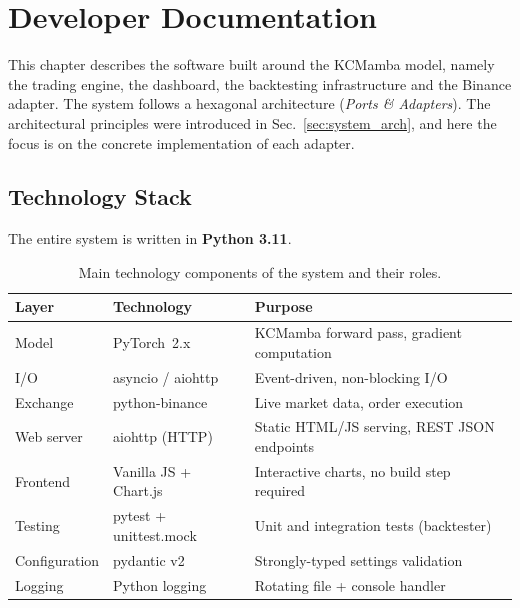 \chapter{Developer Documentation}
\label{ch:implementacio}

This chapter describes the software built around the KCMamba model, namely
the trading engine, the dashboard, the backtesting infrastructure and the Binance adapter.
The system follows a hexagonal architecture (\emph{Ports \& Adapters}).
The architectural principles were introduced in Sec.~\ref{sec:system_arch},
and here the focus is on the concrete implementation of each adapter.

\section{Technology Stack}
\label{sec:impl_tech}

The entire system is written in \textbf{Python 3.11}.

\begin{table}[H]
  \centering
  \small
  \begin{tabular}{|l|l|p{7cm}|}
    \hline
    \textbf{Layer} & \textbf{Technology} & \textbf{Purpose} \\
    \hline\hline
    Model          & PyTorch~2.x          & KCMamba forward pass, gradient computation \\
    I/O            & asyncio / aiohttp    & Event-driven, non-blocking I/O \\
    Exchange       & python-binance       & Live market data, order execution \\
    Web server     & aiohttp (HTTP)       & Static HTML/JS serving, REST JSON endpoints \\
    Frontend       & Vanilla JS + Chart.js & Interactive charts, no build step required \\
    Testing        & pytest + unittest.mock & Unit and integration tests (backtester) \\
    Configuration  & pydantic v2          & Strongly-typed settings validation \\
    Logging        & Python logging       & Rotating file + console handler \\
    \hline
  \end{tabular}
  \caption{Main technology components of the system and their roles.}
  \label{tab:tech_stack}
\end{table}


